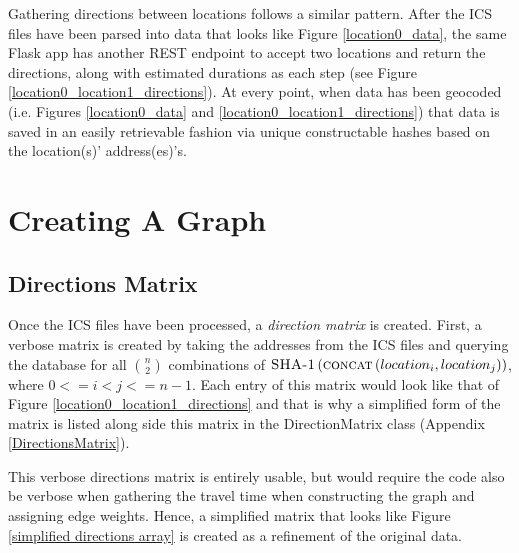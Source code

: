 \documentclass[letterpaper,11pt]{report}
\theoremstyle{definition}
\theoremstyle{definition}
\begin{document}
Gathering directions between locations follows a similar pattern. After the ICS files have been parsed into data that looks like Figure \ref{location0_data}, the same Flask app has another REST endpoint to accept two locations and return the directions, along with estimated durations as each step (see Figure \ref{location0_location1_directions}). At every point, when data has been geocoded (i.e. Figures \ref{location0_data} and \ref{location0_location1_directions}) that data is saved in an easily retrievable fashion via unique constructable hashes based on the location(s)' address(es)'s.

\section{Creating A Graph}
\subsection{Directions Matrix}
Once the ICS files have been processed, a \emph{direction matrix} is created. First, a verbose matrix is created by taking the addresses from the ICS files and querying the database for all $n \choose 2$ combinations of $\textsc{SHA-1}\left(\textsc{concat}\left(location_i, location_j\right)\right)$, where $0 <= i < j <= n-1$. Each entry of this matrix would look like that of Figure \ref{location0_location1_directions} and that is why a simplified form of the matrix is listed along side this matrix in the DirectionMatrix class (Appendix \ref{DirectionsMatrix}).

This verbose directions matrix is entirely usable, but would require the code also be verbose when gathering the travel time when constructing the graph and assigning edge weights. Hence, a simplified matrix that looks like Figure \ref{simplified directions array} is created as a refinement of the original data.
\end{document}
